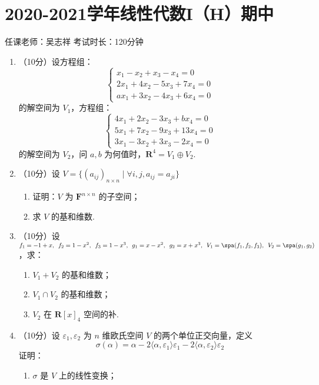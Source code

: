 \section{2020-2021学年线性代数I（H）期中}

\begin{center}
    任课老师：吴志祥\hspace{4em} 考试时长：120分钟
\end{center}
\begin{enumerate}
    \item （10分）设方程组：
    \[\begin{cases}
           x_1-x_2+x_3-x_4=0 \\ 2x_1+4x_2-5x_3+7x_4=0\\ax_1+3x_2-4x_3+6x_4=0
    \end{cases}\]
    的解空间为 $V_1$，方程组：
    \[\begin{cases}
        4x_1+2x_2-3x_3+bx_4=0 \\ 5x_1+7x_2-9x_3+13x_4=0\\3x_1-3x_2+3x_3-2x_4=0
    \end{cases}\]
    的解空间为 $V_2$，问 $a,b$ 为何值时，$\mathbf{R}^4=V_1 \oplus V_2$.

    \item （10分）设 $V=\{(a_{ij})_{n \times n} \mid \forall i, j, a_{ij}=a_{ji}\}$
    \begin{enumerate}
        \item 证明：$V$ 为 $\mathbf{F}^{n \times n}$ 的子空间；

        \item 求 $V$ 的基和维数.
    \end{enumerate}

    \item （10分）设 $f_1=-1+x,\enspace\allowbreak f_2=1-x^2,\enspace\allowbreak f_3=1-x^3,\enspace\allowbreak g_1=x-x^2,\enspace\allowbreak g_2=x+x^3,\enspace\allowbreak V_1=\spa(f_1, f_2, f_3),\enspace\allowbreak V_2=\spa(g_1, g_2)$，求：
    \begin{enumerate}
        \item $V_1+V_2$ 的基和维数；

        \item $V_1 \cap V_2$ 的基和维数；

        \item $V_2$ 在 $\mathbf{R}[x]_4$ 空间的补.
    \end{enumerate}

    \item （10分）设 $\varepsilon_1, \varepsilon_2$ 为 $n$ 维欧氏空间 $V$ 的两个单位正交向量，定义
    \[\sigma(\alpha)=\alpha-2\langle\alpha,\varepsilon_1\rangle\varepsilon_1-2\langle\alpha,\varepsilon_2\rangle\varepsilon_2\]
    证明：
    \begin{enumerate}
        \item $\sigma$ 是 $V$ 上的线性变换；


\end{enumerate}
\end{enumerate}
